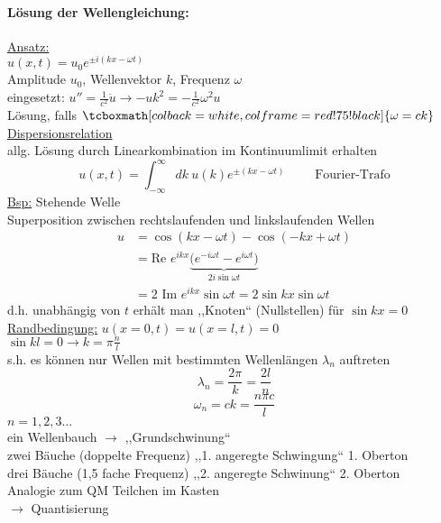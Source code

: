 \documentclass[titlepage,12pt,a4paper,ngerman]{report}
\newcommand{\tx}[1]{\textrm{#1}}
\newcommand{\ub}[1]{\underbrace{#1}}
\newcommand{\rmbox}[1]{\tcboxmath[colback=white,colframe=red!75!black]{#1}} %
\begin{document}
\paragraph{Lösung der Wellengleichung:}
\underline{Ansatz:} \\
$ u(x,t) = u_0 e^{\pm i(kx-\omega t)} $\\
Amplitude $ u_0 $, Wellenvektor $ k $, Frequenz $ \omega $\\
eingesetzt: $ u'' = \frac{1}{c^2} \ddot{u} \rightarrow - u k^2 = - \frac{1}{c^2} \omega^2 u $\\
Lösung, falls $ \rmbox{\omega = ck} $ \underline{Dispersionsrelation}\\
allg. Lösung durch Linearkombination im Kontinuumlimit erhalten
$$ u(x,t) = \int_{-\infty}^{\infty} dk \ u(k) e^{\pm (kx - \omega t)} \qquad \tx{ Fourier-Trafo} $$
\underline{Bsp:} Stehende Welle\\
Superposition zwischen rechtslaufenden und linkslaufenden Wellen
\begin{align*}
u &= \cos (kx - \omega t) - \cos(-kx + \omega t) \\
& = \tx{Re } e^{ikx} \ub{ \bigg( e^{-i\omega t} - e^{i \omega t} \bigg) }_{2 i \sin \omega t}\\
& = 2 \tx{ Im } e^{ikx}\sin \omega t = 2 \sin kx \sin \omega t
\end{align*}
d.h. unabhängig von $ t $ erhält man ,,Knoten`` (Nullstellen) für $ \sin kx = 0 $\\
\underline{Randbedingung:} $ u(x=0,t) = u(x=l,t) = 0 $\\
$ \sin kl = 0 \rightarrow k = \pi \frac{n}{l} $\\
s.h. es können nur Wellen mit bestimmten Wellenlängen $ \lambda_n $ auftreten
$$ \lambda_n = \frac{2 \pi }{k} = \frac{2 l}{n}$$
$$ \omega_n = ck = \frac{n \pi c}{l} $$
$ n = 1,2,3\dots $\\
ein Wellenbauch $ \rightarrow $ ,,Grundschwinung``\\
zwei Bäuche (doppelte Frequenz)  ,,1. angeregte Schwingung`` 1. Oberton \\
drei Bäuche (1,5 fache Frequenz) ,,2. angeregte Schwinung`` 2. Oberton \\
Analogie zum QM Teilchen im Kasten\\
$ \rightarrow $ Quantisierung

\end{document}
